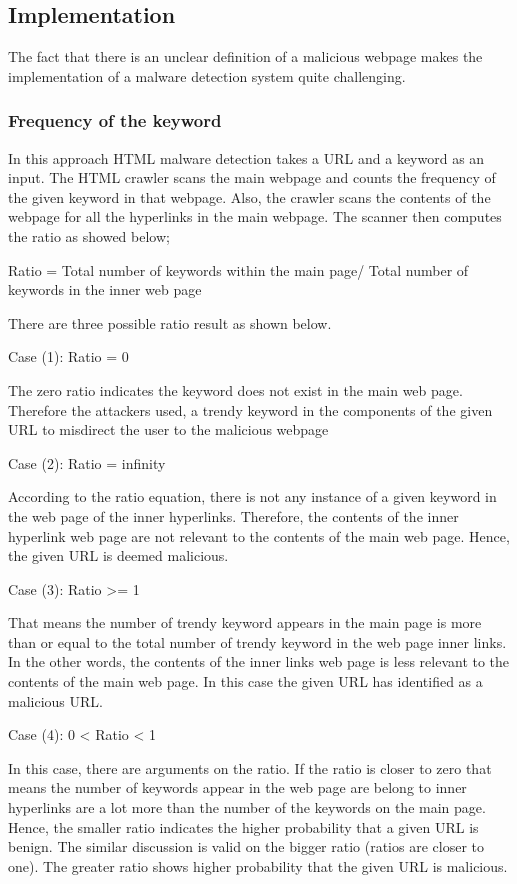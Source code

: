 
\subsection{Implementation}
The fact that there is an unclear definition of a malicious webpage makes the implementation of a malware detection system quite challenging. 	  
	

\subsubsection{Frequency of the keyword}
 
In this approach HTML malware detection takes a URL and a keyword as an input. The HTML crawler scans the main webpage and counts the frequency of the given keyword in that webpage. Also, the crawler scans the contents of the webpage for all the hyperlinks in the main webpage. The scanner then computes the ratio as showed below;

Ratio = Total number of keywords within the main page/ Total number of keywords in the inner web page 

There are three possible ratio result as shown below. 

Case (1): Ratio = 0

The zero ratio indicates the keyword does not exist in the main web page. Therefore the attackers used, a trendy keyword in the components of the given URL to misdirect the user to the malicious webpage

Case (2): Ratio = infinity

According to the ratio equation, there is not any instance of a given keyword in the web page of the inner hyperlinks. Therefore, the contents of the inner hyperlink web page are not relevant to the contents of the main web page. Hence, the given URL is deemed malicious.

Case (3): Ratio >= 1

That means the number of trendy keyword appears in the main page is more than or equal to the total number of trendy keyword in the web page inner links. In the other words, the contents of the inner links web page is less relevant to the contents of the main web page. In this case the given URL has identified as a malicious URL. 

Case (4): 0 < Ratio < 1

In this case, there are arguments on the ratio. If the ratio is closer to zero that means the number of keywords appear in the web page are belong to inner hyperlinks are a lot more than the number of the keywords on the main page. Hence, the smaller ratio indicates the higher probability that a given URL is benign. The similar discussion is valid on the bigger ratio (ratios are closer to one). The greater ratio shows higher probability that the given URL is malicious. 

